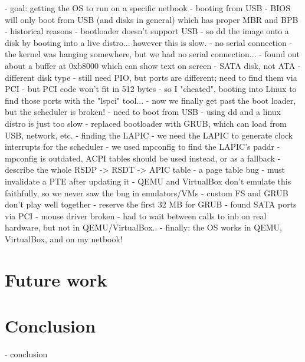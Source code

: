 \documentclass{article}
\begin{document}
- goal: getting the OS to run on a specific netbook
- booting from USB
	- BIOS will only boot from USB (and disks in general) which has proper MBR and BPB
	- historical reasons
- bootloader doesn't support USB
	- so dd the image onto a disk by booting into a live distro... however
	  this is slow.
- no serial connection
	- the kernel was hanging somewhere, but we had no serial connection...
	- found out about a buffer at 0xb8000 which can show text on screen
- SATA disk, not ATA
	- different disk type
	- still need PIO, but ports are different; need to find them via PCI
	- but PCI code won't fit in 512 bytes
	- so I "cheated", booting into Linux to find those ports with the "lspci"
	  tool...
	- now we finally get past the boot loader, but the scheduler is broken!
- need to boot from USB
	- using dd and a linux distro is just too slow
	- replaced bootloader with GRUB, which can load from USB, network, etc.
- finding the LAPIC
	- we need the LAPIC to generate clock interrupts for the scheduler
	- we used mpconfig to find the LAPIC's paddr
	- mpconfig is outdated, ACPI tables should be used instead, or as a
	  fallback
	- describe the whole RSDP -> RSDT -> APIC table
- a page table bug
	- must invalidate a PTE after updating it
	- QEMU and VirtualBox don't emulate this faithfully, so we never saw the
	  bug in emulators/VMs
- custom FS and GRUB don't play well together
	- reserve the first 32 MB for GRUB
- found SATA ports via PCI
- mouse driver broken
	- had to wait between calls to inb on real hardware, but not in
	  QEMU/VirtualBox..
- finally: the OS works in QEMU, VirtualBox, and on my netbook!





\section{Future work}


\section{Conclusion}
- conclusion
\end{document}
